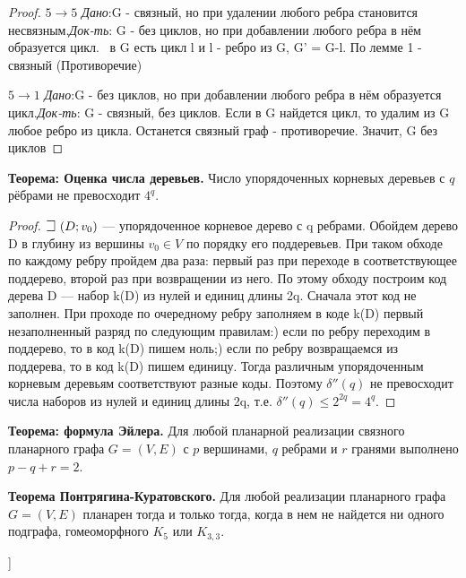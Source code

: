 \begin{itemize}
\begin{proof}
$5 \rightarrow 5$ \textit{Дано}:G - связный, но при удалении любого ребра становится несвязным.\textit{Док-ть}: G - без циклов, но при добавлении любого ребра в нём образуется цикл.\newline
\mathLet \ в G есть цикл l и l - ребро из G, G' = G-l. По лемме 1 - связный (Противоречие)

$5 \rightarrow 1$ \textit{Дано}:G - без циклов, но при добавлении любого ребра в нём образуется цикл.\textit{Док-ть}: G - связный, без циклов. \newline
Если в G найдется цикл, то удалим из G любое ребро из цикла. Останется связный граф - противоречие. Значит, G без циклов
\end{proof}

\end{itemize}

\textbf{Теорема: Оценка числа деревьев.} Число упорядоченных корневых деревьев с $q$ рёбрами не превосходит $4^q$.

\begin{proof}
$\mathLet ~ (D; v_0)$ — упорядоченное корневое дерево с q ребрами. Обойдем дерево D в глубину из вершины $v_0 \in V$ по порядку его поддеревьев. При таком обходе по каждому ребру пройдем два раза: первый раз при переходе в соответствующее поддерево, второй раз при возвращении из него.
По этому обходу построим код дерева D — набор k(D) из нулей и единиц длины 2q. Сначала этот код не заполнен. При проходе по очередному ребру заполняем в коде k(D) первый незаполненный разряд по следующим правилам:) если по ребру переходим в поддерево, то в код k(D) пишем ноль;) если по ребру возвращаемся из поддерева, то в код k(D) пишем единицу.
Тогда различным упорядоченным корневым деревьям соответствуют разные коды.
Поэтому $\delta''(q)$ не превосходит числа наборов из нулей и единиц длины 2q, т.е.
$\delta''(q) \leq 2^{2q} = 4^q$.
\end{proof}

\textbf{Теорема: формула Эйлера.} Для любой планарной реализации связного планарного графа $G=(V,E)$ с $p$ вершинами, $q$ ребрами и $r$ гранями выполнено $p-q+r=2$.

\textbf{Теорема Понтрягина-Куратовского.} Для любой реализации планарного графа $G=(V,E)$ планарен тогда и только тогда, когда в нем не найдется ни одного подграфа, гомеоморфного $K_5$ или $K_{3,3}$.

\bigbreak
[\cite[page 69-96]{replace_me}]
